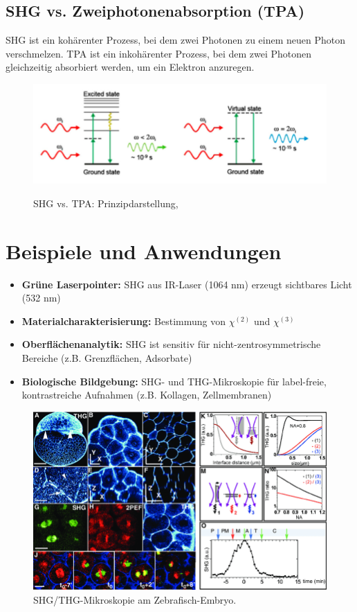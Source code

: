\documentclass[9pt,a4paper,twocolumn,twoside]{tau-class/tau}
\begin{document}
\subsection{SHG vs. Zweiphotonenabsorption (TPA)}
SHG ist ein kohärenter Prozess, bei dem zwei Photonen zu einem neuen Photon verschmelzen. TPA ist ein inkohärenter Prozess, bei dem zwei Photonen gleichzeitig absorbiert werden, um ein Elektron anzuregen.
\begin{figure}[!ht]
\centering
\includegraphics[width=0.6\columnwidth]{../praes/Images/shg vs tpa.png}\\[-1mm]
\caption{{SHG vs. TPA: Prinzipdarstellung, \cite{Zhang2020}}}
\end{figure}


\section{Beispiele und Anwendungen}
\begin{itemize}
    \item \textbf{Grüne Laserpointer:} SHG aus IR-Laser (1064 nm) erzeugt sichtbares Licht (532 nm)
    \item \textbf{Materialcharakterisierung:} Bestimmung von $\chi^{(2)}$ und $\chi^{(3)}$
    \item \textbf{Oberflächenanalytik:} SHG ist sensitiv für nicht-zentrosymmetrische Bereiche (z.B. Grenzflächen, Adsorbate)
    \item \textbf{Biologische Bildgebung:} SHG- und THG-Mikroskopie für label-freie, kontrastreiche Aufnahmen (z.B. Kollagen, Zellmembranen)
\end{itemize}

\begin{figure}[!ht]
\centering
\includegraphics[width=0.6\columnwidth]{../praes/Images/THG-and-SHG-signals-in-the-zebrafish-embryo-during-cleavage-stages-A-Sagittal-THG.png}
\caption{SHG/THG-Mikroskopie am Zebrafisch-Embryo.\cite{ResearchGateZebrafish2009}}
\end{figure}
\end{document}
